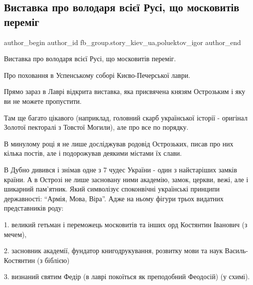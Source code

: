  
 
 
 
 
 
\subsection{Виставка про володаря всієї Русі, що московитів переміг}
\label{sec:13_01_2022.fb.fb_group.story_kiev_ua.1.vystavka_knjaz_ostrozhskij}
 
\ifcmt
 author_begin
   author_id fb_group.story_kiev_ua,poluektov_igor
 author_end
\fi

Виставка про володаря всієї Русі, що московитів переміг.

Про поховання в Успенському соборі Києво-Печерської лаври.

Прямо зараз в Лаврі відкрита виставка, яка присвячена князям Острозьким і яку
ви не можете пропустити. 

Там ще багато цікавого (наприклад, головний скарб української історії -
оригінал Золотої пекторалі з Товстої Могили), але про все по порядку.

В минулому році я не лише досліджував родовід Острозьких, писав про них кілька
постів, але і подорожував деякими містами їх слави.

В Дубно дивився і знімав одне з 7 чудес України - один з найстаріших замків
країни. А в Острозі не лише засновану ними академію, замок, церкви, вежі, але і
шикарний пам’ятник. Який символізує споконвічні українські принципи
державності: \enquote{Армія, Мова, Віра}. Адже на ньому фігури трьох видатних
представників роду:

1. великий гетьман і переможець московитів та інших орд Костянтин Іванович (з
мечем), 

2. засновник академії, фундатор книгодрукування, розвитку мови та наук
Василь-Костянтин (з біблією) 

3. визнаний святим Федір (в лаврі покоїться як преподобний Феодосій) (у схимі).

